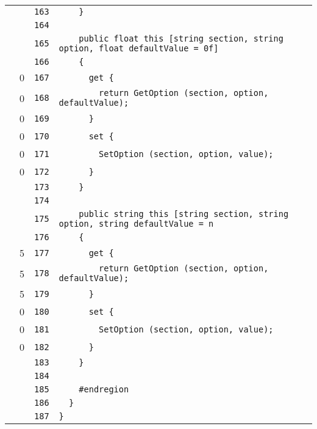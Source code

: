 \documentclass[a4paper,10pt]{article}
\begin{document}
\begin{longtable}[l]{lrrl}
\cellcolor{gray} &  & \verb~163~ & \verb~    }~\\
\cellcolor{gray} &  & \verb~164~ & \verb~~\\
\cellcolor{gray} &  & \verb~165~ & \verb~    public float this [string section, string option, float defaultValue = 0f]~\\
\cellcolor{gray} &  & \verb~166~ & \verb~    {~\\
\cellcolor{red} & 0 & \verb~167~ & \verb~      get {~\\
\cellcolor{red} & 0 & \verb~168~ & \verb~        return GetOption (section, option, defaultValue);~\\
\cellcolor{red} & 0 & \verb~169~ & \verb~      }~\\
\cellcolor{red} & 0 & \verb~170~ & \verb~      set {~\\
\cellcolor{red} & 0 & \verb~171~ & \verb~        SetOption (section, option, value);~\\
\cellcolor{red} & 0 & \verb~172~ & \verb~      }~\\
\cellcolor{gray} &  & \verb~173~ & \verb~    }~\\
\cellcolor{gray} &  & \verb~174~ & \verb~~\\
\cellcolor{gray} &  & \verb~175~ & \verb~    public string this [string section, string option, string defaultValue = n~\\
\cellcolor{gray} &  & \verb~176~ & \verb~    {~\\
\cellcolor{green} & 5 & \verb~177~ & \verb~      get {~\\
\cellcolor{green} & 5 & \verb~178~ & \verb~        return GetOption (section, option, defaultValue);~\\
\cellcolor{green} & 5 & \verb~179~ & \verb~      }~\\
\cellcolor{red} & 0 & \verb~180~ & \verb~      set {~\\
\cellcolor{red} & 0 & \verb~181~ & \verb~        SetOption (section, option, value);~\\
\cellcolor{red} & 0 & \verb~182~ & \verb~      }~\\
\cellcolor{gray} &  & \verb~183~ & \verb~    }~\\
\cellcolor{gray} &  & \verb~184~ & \verb~~\\
\cellcolor{gray} &  & \verb~185~ & \verb~    #endregion~\\
\cellcolor{gray} &  & \verb~186~ & \verb~  }~\\
\cellcolor{gray} &  & \verb~187~ & \verb~}~\\
\end{longtable}
\newpage
\end{document}
